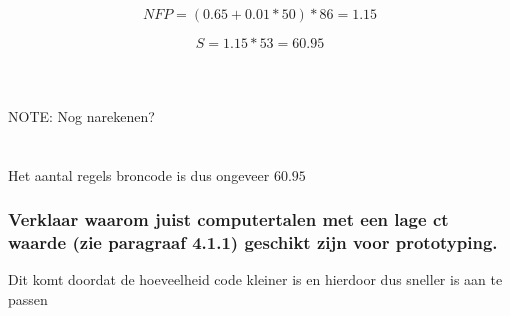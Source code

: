 \documentclass[a4paper,titlepage]{artikel1}
\begin{document}
   \begin{displaymath}
    NFP=(0.65+0.01*50)*86=1.15
   \end{displaymath}
   
   \begin{displaymath}
    S=1.15*53=60.95
   \end{displaymath}
   \\\\\\NOTE: Nog narekenen?\\\\\\
   Het aantal regels broncode is dus ongeveer $60.95$
   \subsubsection[Opdracht 7]{Verklaar waarom juist computertalen met een lage ct waarde (zie paragraaf 4.1.1) geschikt zijn voor prototyping.}
   Dit komt doordat de hoeveelheid code kleiner is en hierdoor dus sneller is aan te passen
   
\end{document}
